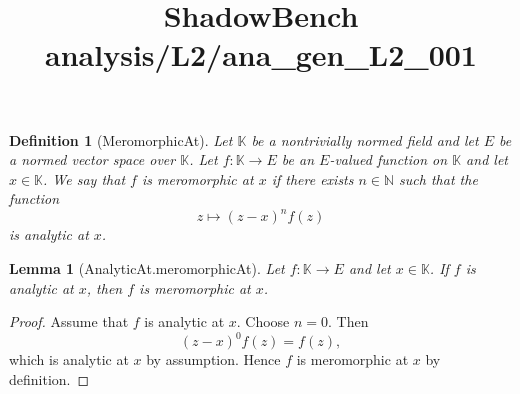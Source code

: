 \documentclass{article}
\title{ShadowBench analysis/L2/ana\_gen\_L2\_001}
\newtheorem{lemma}{Lemma}
\newtheorem{definition}{Definition}
\begin{document}
\maketitle

\begin{definition}[MeromorphicAt] Let $\mathbb{K}$ be a nontrivially normed field and let $E$ be a normed vector space over $\mathbb{K}$. Let $f : \mathbb{K} \to E$ be an $E$-valued function on $\mathbb K$ and let $x \in \mathbb{K}$. We say that $f$ is \emph{meromorphic at $x$} if there exists $n \in \mathbb{N}$ such that the function
\[
z \longmapsto (z - x)^n f(z)
\]
is analytic at $x$.
\end{definition}

\begin{lemma}[AnalyticAt.meromorphicAt] 
Let $f : \mathbb K \to E$ and let $x \in \mathbb K$. If $f$ is analytic at $x$, then $f$ is meromorphic at $x$.
\end{lemma}


\begin{proof}
Assume that $f$ is analytic at $x$. Choose $n = 0$. Then
\[
(z - x)^0 f(z) = f(z),
\]
which is analytic at $x$ by assumption. Hence $f$ is meromorphic at $x$ by definition.
\end{proof}
\end{document}
